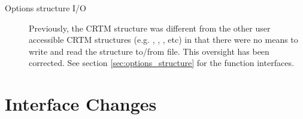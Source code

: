 \begin{description}
\item[Options structure I/O] Previously, the CRTM \Options structure was different from the other user accessible CRTM structures (e.g. \Atmosphere, \Surface, \Geometry, etc) in that there were no means to write and read the structure to/from file. This oversight has been corrected. See section \ref{sec:options_structure} for the function interfaces.

\end{description}


\section*{Interface Changes}
\label{sec:new_interface_changes}

